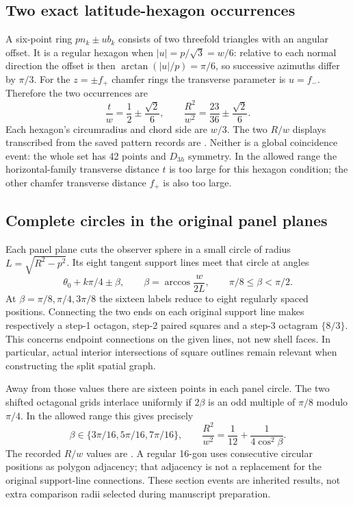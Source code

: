 \documentclass[11pt,a4paper]{article}
\begin{document}
\subsection{Two exact latitude-hexagon occurrences}
A six-point ring $p n_k\pm u b_k$ consists of two threefold triangles with an angular offset. It is a regular hexagon when $|u|=p/\sqrt3=w/6$: relative to each normal direction the offset is then $\arctan(|u|/p)=\pi/6$, so successive azimuths differ by $\pi/3$. For the $z=\pm f_+$ chamfer rings the transverse parameter is $u=f_-$. Therefore the two occurrences are
\begin{equation}\label{eq:hexagons}
\frac tw=\frac12\pm\frac{\sqrt2}{6},\qquad
\frac{R^2}{w^2}=\frac{23}{36}\pm\frac{\sqrt2}{6}.
\end{equation}
Each hexagon's circumradius and chord side are $w/3$. The two $R/w$ displays transcribed from the saved pattern records are . Neither is a global coincidence event: the whole set has 42 points and $D_{3h}$ symmetry. In the allowed range the horizontal-family transverse distance $t$ is too large for this hexagon condition; the other chamfer transverse distance $f_+$ is also too large.

\subsection{Complete circles in the original panel planes}
Each panel plane cuts the observer sphere in a small circle of radius $L=\sqrt{R^2-p^2}$. Its eight tangent support lines meet that circle at angles
\begin{equation}\label{eq:beta}
\theta_0+k\pi/4\pm\beta,\qquad
\beta=\arccos\frac{w}{2L},\qquad \pi/8\leq\beta<\pi/2.
\end{equation}
At $\beta=\pi/8,\pi/4,3\pi/8$ the sixteen labels reduce to eight regularly spaced positions. Connecting the two ends on each original support line makes respectively a step-1 octagon, step-2 paired squares and a step-3 octagram $\{8/3\}$. This concerns endpoint connections on the given lines, not new shell faces. In particular, actual interior intersections of square outlines remain relevant when constructing the split spatial graph.

Away from those values there are sixteen points in each panel circle. The two shifted octagonal grids interlace uniformly if $2\beta$ is an odd multiple of $\pi/8$ modulo $\pi/4$. In the allowed range this gives precisely
\begin{equation}\label{eq:16gons}
\beta\in\{3\pi/16,5\pi/16,7\pi/16\},\qquad
\frac{R^2}{w^2}=\frac1{12}+\frac1{4\cos^2\beta}.
\end{equation}
The recorded $R/w$ values are . A regular 16-gon uses consecutive circular positions as polygon adjacency; that adjacency is not a replacement for the original support-line connections. These section events are inherited results, not extra comparison radii selected during manuscript preparation.
\end{document}
